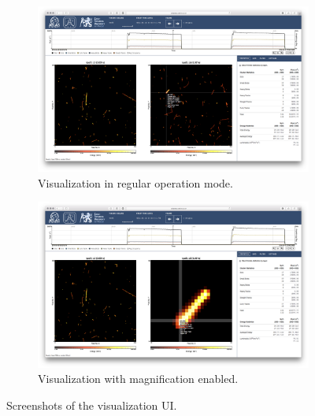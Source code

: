\begin{figure}[t]
\begin{center}
	\begin{subfigure}{\textwidth}
	\includegraphics[width=\textwidth]{figures/screen-tpx01-crosshair}
	\caption{Visualization in regular operation mode.}
	\label{fig:screenshot-normal}
	\end{subfigure}

	\vspace{0.2cm}

	\begin{subfigure}{\textwidth}
	\includegraphics[width=\textwidth]{figures/screen-tpx01-crosshair-zoomed}
	\caption{Visualization with magnification enabled.}
	\label{fig:screenshot-zoomed}
	\end{subfigure}
\caption{Screenshots of the visualization UI.}
\label{fig:screenshots}
\end{center}
\end{figure}
